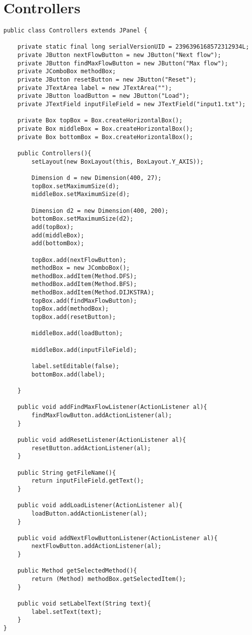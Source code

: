 \chapter{Controllers}
\lstset{language=Java}
\begin{lstlisting}[caption=Controllers Source Code]
public class Controllers extends JPanel {

	private static final long serialVersionUID = 2396396168572312934L;
	private JButton nextFlowButton = new JButton("Next flow");
	private JButton findMaxFlowButton = new JButton("Max flow");
	private JComboBox methodBox;
	private JButton resetButton = new JButton("Reset");
	private JTextArea label = new JTextArea("");
	private JButton loadButton = new JButton("Load");
	private JTextField inputFileField = new JTextField("input1.txt");
	
	private Box topBox = Box.createHorizontalBox();
	private Box middleBox = Box.createHorizontalBox();
	private Box bottomBox = Box.createHorizontalBox();
	
	public Controllers(){
		setLayout(new BoxLayout(this, BoxLayout.Y_AXIS));
		
		Dimension d = new Dimension(400, 27);
		topBox.setMaximumSize(d);
		middleBox.setMaximumSize(d);
		
		Dimension d2 = new Dimension(400, 200);
		bottomBox.setMaximumSize(d2);
		add(topBox);
		add(middleBox);
		add(bottomBox);
		
		topBox.add(nextFlowButton);
		methodBox = new JComboBox();
		methodBox.addItem(Method.DFS);
		methodBox.addItem(Method.BFS);
		methodBox.addItem(Method.DIJKSTRA);
		topBox.add(findMaxFlowButton);
		topBox.add(methodBox);
		topBox.add(resetButton);
		
		middleBox.add(loadButton);
		
		middleBox.add(inputFileField);
		
		label.setEditable(false);
		bottomBox.add(label);

	}
	
	public void addFindMaxFlowListener(ActionListener al){
		findMaxFlowButton.addActionListener(al);
	}
	
	public void addResetListener(ActionListener al){
		resetButton.addActionListener(al);
	}
	
	public String getFileName(){
		return inputFileField.getText();
	}
	
	public void addLoadListener(ActionListener al){
		loadButton.addActionListener(al);
	}
	
	public void addNextFlowButtonListener(ActionListener al){
		nextFlowButton.addActionListener(al);
	}
	
	public Method getSelectedMethod(){
		return (Method) methodBox.getSelectedItem();
	}
	
	public void setLabelText(String text){
		label.setText(text);
	}
}
\end{lstlisting}